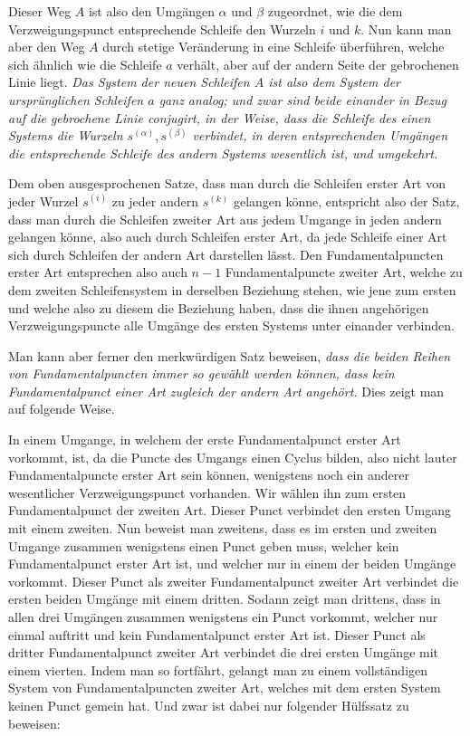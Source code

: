 \documentclass[10pt]{article}
\begin{document}
Dieser Weg \(A\) ist also den Umgängen \(\alpha\) und \(\beta\) zugeordnet, wie die dem Verzweigungspunct entsprechende Schleife den Wurzeln \(i\) und \(k\). Nun kann man aber den Weg \(A\) durch stetige Veränderung in eine Schleife überführen, welche sich ähnlich wie die Schleife \(a\) verhält, aber auf der andern Seite der gebrochenen Linie liegt. \emph{Das System der neuen Schleifen \(A\) ist also dem System der ursprünglichen Schleifen \(a\) ganz analog; und zwar sind beide einander in Bezug auf die gebrochene Linie conjugirt, in der Weise, dass die Schleife des einen Systems die Wurzeln \(s^{(\alpha)},s^{(\beta)}\) verbindet, in deren entsprechenden Umgängen die entsprechende Schleife des andern Systems wesentlich ist, und umgekehrt.}

Dem oben ausgesprochenen Satze, dass man durch die Schleifen erster Art von jeder Wurzel \(s^{(i)}\) zu jeder andern \(s^{(k)}\) gelangen könne, entspricht also der Satz, dass man durch die Schleifen zweiter Art aus jedem Umgange in jeden andern gelangen könne, also auch durch Schleifen erster Art, da jede Schleife einer Art sich durch Schleifen der andern Art darstellen lässt. Den Fundamentalpuncten erster Art entsprechen also auch \(n-1\) Fundamentalpuncte zweiter Art, welche zu dem zweiten Schleifensystem in derselben Beziehung stehen, wie jene zum ersten und welche also zu diesem die Beziehung haben, dass die ihnen angehörigen Verzweigungspuncte alle Umgänge des ersten Systems unter einander verbinden.

Man kann aber ferner den merkwürdigen Satz beweisen, \emph{dass die beiden Reihen von Fundamentalpuncten immer so gewählt werden können, dass kein Fundamentalpunct einer Art zugleich der andern Art angehört.} Dies zeigt man auf folgende Weise.

In einem Umgange, in welchem der erste Fundamentalpunct erster Art vorkommt, ist, da die Puncte des Umgangs einen Cyclus bilden, also nicht lauter Fundamentalpuncte erster Art sein können, wenigstens noch ein anderer wesentlicher Verzweigungspunct vorhanden. Wir wählen ihn zum ersten Fundamentalpunct der zweiten Art. Dieser Punct verbindet den ersten Umgang mit einem zweiten. Nun beweist man zweitens, dass es im ersten und zweiten Umgange zusammen wenigstens einen Punct geben muss, welcher kein Fundamentalpunct erster Art ist, und welcher nur in einem der beiden Umgänge vorkommt. Dieser Punct als zweiter Fundamentalpunct zweiter Art verbindet die ersten beiden Umgänge mit einem dritten. Sodann zeigt man drittens, dass in allen drei Umgängen zusammen wenigstens ein Punct vorkommt, welcher nur einmal auftritt und kein Fundamentalpunct erster Art ist. Dieser Punct als dritter Fundamentalpunct zweiter Art verbindet die drei ersten Umgänge mit einem vierten. Indem man so fortfährt, gelangt man zu einem vollständigen System von Fundamentalpuncten zweiter Art, welches mit dem ersten System keinen Punct gemein hat. Und zwar ist dabei nur folgender Hülfssatz zu beweisen:
\end{document}
